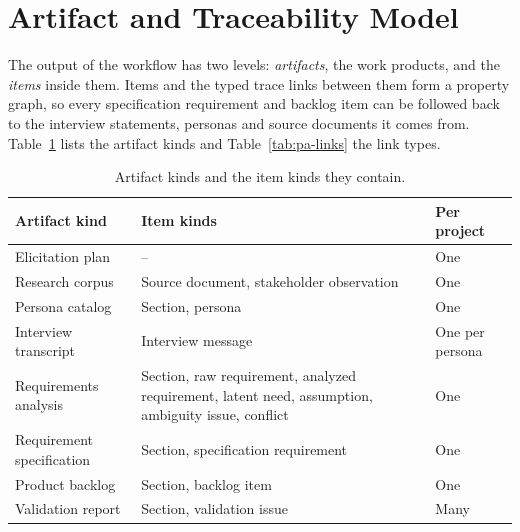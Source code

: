 \section{Artifact and Traceability Model}
\label{sec:pa-artifacts}

The output of the workflow has two levels: \emph{artifacts}, the work products, and the \emph{items} inside them. Items and the typed trace links between them form a property graph, so every specification requirement and backlog item can be followed back to the interview statements, personas and source documents it comes from. Table~\ref{tab:pa-artifacts} lists the artifact kinds and Table~\ref{tab:pa-links} the link types.

\begin{table}[H]
    \centering
    \caption{Artifact kinds and the item kinds they contain.}
    \label{tab:pa-artifacts}
    \begin{tabularx}{\linewidth}{|l|X|l|}
        \hline
        \textbf{Artifact kind} & \textbf{Item kinds} & \textbf{Per project} \\
        \hline
        Elicitation plan & -- & One \\
        Research corpus & Source document, stakeholder observation & One \\
        Persona catalog & Section, persona & One \\
        Interview transcript & Interview message & One per persona \\
        Requirements analysis & Section, raw requirement, analyzed requirement, latent need, assumption, ambiguity issue, conflict & One \\
        Requirement specification & Section, specification requirement & One \\
        Product backlog & Section, backlog item & One \\
        Validation report & Section, validation issue & Many \\
        \hline
    \end{tabularx}
\end{table}

